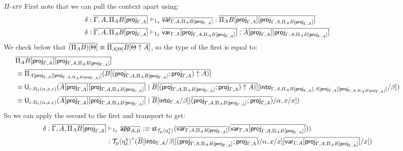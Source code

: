 \documentclass[10pt]{article}
\theoremstyle{definition}
\newcommand{\yields}{\vdash}
\newcommand\U[3]{\ensuremath{\mathsf{U}_{#1}(#2 \mid #3)}}
\newcommand\St[2]{\ensuremath{{#1}^*(#2)}}
\newcommand\StI[2]{\ensuremath{\mathsf{st}_{#1}(#2)}}
\newcommand\ApEl[2]{\mathcal{T}_{#1}\langle#2\rangle}
\begin{document}
\begin{enumerate}
\item[\textsc{$\Pi$-app}] First note that we can pull the context apart using:
\begin{align*}
\delta : \upstairs{\Gamma, A, \Pi_A B[\proj{\Gamma, A}]} &\yields_{1_\delta} \upstairs{\qvar{\Gamma, A, \Pi_A B[\proj{\Gamma, A}]}} : \upstairs{\Pi_A B[\proj{\Gamma, A}][\proj{\Gamma, A, \Pi_A B[\proj{\Gamma, A}]}]} \\ 
\delta : \upstairs{\Gamma, A, \Pi_A B[\proj{\Gamma, A}]} &\yields_{1_\delta} \upstairs{\qvar{\Gamma, A}[\proj{\Gamma, A, \Pi_A B[\proj{\Gamma, A}]}]} : \upstairs{A[\proj{\Gamma, A}][\proj{\Gamma, A, \Pi_A B[\proj{\Gamma, A}]}]} 
\end{align*}
We check below that $\overline{(\Pi_A B)[\Theta]} \equiv \overline{\Pi_{A[\Theta]} B[\Theta \uparrow A]}$, so the type of the first is equal to:
\begin{align*}
&\upstairs{\Pi_A B[\proj{\Gamma, A}][\proj{\Gamma, A, \Pi_A B[\proj{\Gamma, A}]}]} \\
&\equiv \upstairs{\Pi_{A[\proj{\Gamma, A}][\proj{\Gamma, A, \Pi_A B[\proj{\Gamma, A}]}]} (B[(\proj{\Gamma, A, \Pi_A B[\proj{\Gamma, A}]};\proj{\Gamma, A}) \uparrow A)]} \\
&\equiv \U{c. \Pi_1(\alpha,x,c)}{\upstairs{A[\proj{\Gamma, A}][\proj{\Gamma, A, \Pi_A B[\proj{\Gamma, A}]}]}}{\upstairs{B[(\proj{\Gamma, A, \Pi_A B[\proj{\Gamma, A}]};\proj{\Gamma, A}) \uparrow A)]}[\into{\Gamma, A, \Pi_A B[\proj{\Gamma, A}], A[\proj{\Gamma, A}][\proj{\Gamma, A, \Pi_A B[\proj{\Gamma, A}]}]}/\beta]} \\
&\equiv \U{c. \Pi_1(\alpha,x,c)}{\upstairs{A[\proj{\Gamma, A}][\proj{\Gamma, A, \Pi_A B[\proj{\Gamma, A}]}]}}{\upstairs{B}[\into{\Gamma, A}/\beta][\upstairs{(\proj{\Gamma, A, \Pi_A B[\proj{\Gamma, A}]};\proj{\Gamma, A})}/\alpha, x/x]}
\end{align*}
So we can apply the second to the first and transport to get:
\begin{align*}
\delta : \upstairs{\Gamma, A, \Pi_A B[\proj{\Gamma, A}]} &\yields_{1_\delta} \upstairs{\qapp{A,B}} :\equiv \StI{\ApEl{p}{\eta^\chi_\delta}}{\upstairs{\qvar{\Gamma, A, \Pi_A B[\proj{\Gamma, A}]}}(\upstairs{\qvar{\Gamma, A}[\proj{\Gamma, A, \Pi_A B[\proj{\Gamma, A}]}]})} \\&: \St{\ApEl{p}{\eta^\chi_\delta}}{\upstairs{B}[\into{\Gamma, A}/\beta][\upstairs{(\proj{\Gamma, A, \Pi_A B[\proj{\Gamma, A}]};\proj{\Gamma, A})}/\alpha, x/x][\upstairs{\qvar{\Gamma, A}[\proj{\Gamma, A, \Pi_A B[\proj{\Gamma, A}]}]}/x]}
\end{align*}

\end{enumerate}
\end{document}

